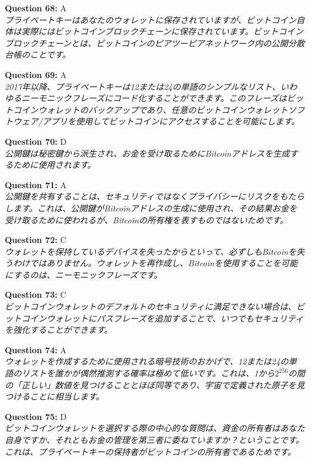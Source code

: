 \documentclass[12pt,a4paper]{article}
\begin{document}
\begin{enumerate}
{{{{{{\item \textbf{Question 68:} A
\\ \textit{プライベートキーはあなたのウォレットに保存されていますが、ビットコイン自体は実際にはビットコインブロックチェーンに保存されています。ビットコインブロックチェーンとは、ビットコインのピアツーピアネットワーク内の公開分散台帳のことです。}

\item \textbf{Question 69:} A
\\ \textit{2017年以降、プライベートキーは12または24の単語のシンプルなリスト、いわゆるニーモニックフレーズにコード化することができます。このフレーズはビットコインウォレットのバックアップであり、任意のビットコインウォレットソフトウェア/アプリを使用してビットコインにアクセスすることを可能にします。}

\item \textbf{Question 70:} D
\\ \textit{公開鍵は秘密鍵から派生され、お金を受け取るためにBitcoinアドレスを生成するために使用されます。}

\item \textbf{Question 71:} A
\\ \textit{公開鍵を共有することは、セキュリティではなくプライバシーにリスクをもたらします。これは、公開鍵がBitcoinアドレスの生成に使用され、その結果お金を受け取るために使われるが、Bitcoinの所有権を表すものではないためです。}

\item \textbf{Question 72:} C
\\ \textit{ウォレットを保持しているデバイスを失ったからといって、必ずしもBitcoinを失うわけではありません。ウォレットを再作成し、Bitcoinを使用することを可能にするのは、ニーモニックフレーズです。}

\item \textbf{Question 73:} C
\\ \textit{ビットコインウォレットのデフォルトのセキュリティに満足できない場合は、ビットコインウォレットにパスフレーズを追加することで、いつでもセキュリティを強化することができます。}

\item \textbf{Question 74:} A
\\ \textit{ウォレットを作成するために使用される暗号技術のおかげで、12または24の単語のリストを誰かが偶然推測する確率は極めて低いです。これは、1から$2^256$の間の「正しい」数値を見つけることとほぼ同等であり、宇宙で定義された原子を見つけることに相当します。}

\item \textbf{Question 75:} D
\\ \textit{ビットコインウォレットを選択する際の中心的な質問は、資金の所有者はあなた自身ですか、それともお金の管理を第三者に委ねていますか？ということです。これは、プライベートキーの保持者がビットコインの所有者であるためです。}

}}}}}}
\end{enumerate}
\end{document}

